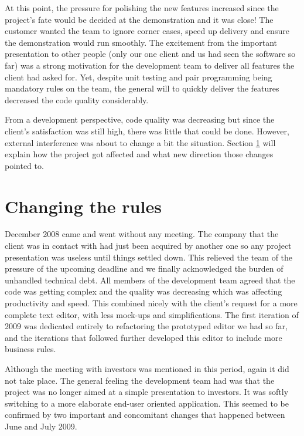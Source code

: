 \documentclass[lnbip]{svmultln}
\begin{document}
At this point, the pressure for polishing the new features increased
since the project's fate would be decided at the demonstration and it
was close! The customer wanted the team to ignore corner cases, speed
up delivery and ensure the demonstration would run smoothly. The
excitement from the important presentation to other people (only our
one client and us had seen the software so far) was a strong
motivation for the development team to deliver all features the client
had asked for. Yet, despite unit testing and pair programming being
mandatory rules on the team, the general will to quickly deliver the
features decreased the code quality considerably.

From a development perspective, code quality was decreasing but since
the client's satisfaction was still high, there was little that could
be done.  However, external interference was about to change a bit the
situation. Section \ref{sec:changes} will explain how the project got
affected and what new direction those changes pointed to.

\section{Changing the rules}
\label{sec:changes}

December 2008 came and went without any meeting. The company that the
client was in contact with had just been acquired by another one so
any project presentation was useless until things settled down. This
relieved the team of the pressure of the upcoming deadline and we
finally acknowledged the burden of unhandled technical debt. All
members of the development team agreed that the code was getting
complex and the quality was decreasing which was affecting
productivity and speed. This combined nicely with the client's request
for a more complete text editor, with less mock-ups and
simplifications. The first iteration of 2009 was dedicated entirely to
refactoring the prototyped editor we had so far, and the iterations
that followed further developed this editor to include more business
rules.

Although the meeting with investors was mentioned in this period,
again it did not take place. The general feeling the development team
had was that the project was no longer aimed at a simple presentation
to investors. It was softly switching to a more elaborate end-user
oriented application. This seemed to be confirmed by two important and
concomitant changes that happened between June and July 2009.
\end{document}
